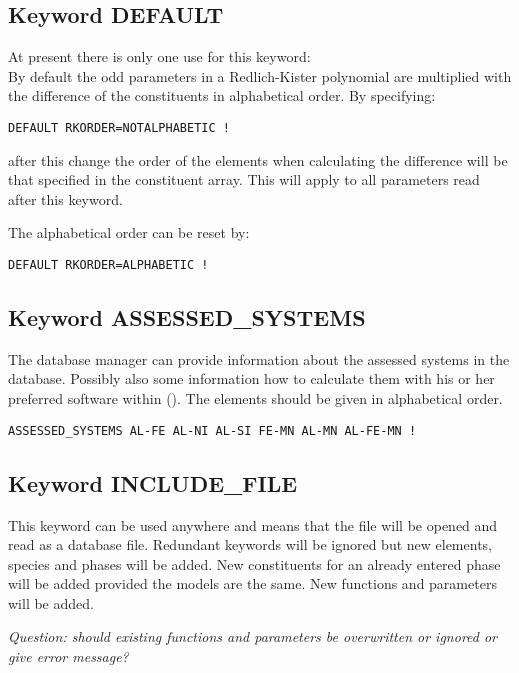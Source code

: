 \documentclass[12pt]{article}
\begin{document}
\subsection{Keyword DEFAULT}\label{sec:defaults}

At present there is only one use for this keyword:\\

By default the odd parameters in a Redlich-Kister polynomial are
multiplied with the difference of the constituents in alphabetical order.
By specifying:
\begin{verbatim}
DEFAULT RKORDER=NOTALPHABETIC !
\end{verbatim}
after this change the order of the elements when calculating the
difference will be that specified in the constituent array.  This will
apply to all parameters read after this keyword.

The alphabetical order can be reset by:
\begin{verbatim}
DEFAULT RKORDER=ALPHABETIC !
\end{verbatim}

\subsection{Keyword ASSESSED\_SYSTEMS}\label{sec:assys}

The database manager can provide information about the assessed
systems in the database.  Possibly also some information how to
calculate them with his or her preferred software within ().  The
elements should be given in alphabetical order.

\begin{verbatim}
ASSESSED_SYSTEMS AL-FE AL-NI AL-SI FE-MN AL-MN AL-FE-MN !
\end{verbatim}

\subsection{Keyword INCLUDE\_FILE}

This keyword can be used anywhere and means that the file will be
opened and read as a database file.  Redundant keywords will be
ignored but new elements, species and phases will be added.  New
constituents for an already entered phase will be added provided the
models are the same.  New functions and parameters will be added.

{\em Question: should existing functions and parameters be overwritten
  or ignored or give error message?}
\end{document}
